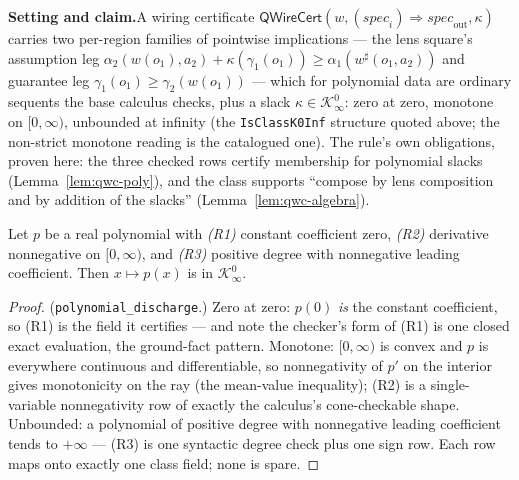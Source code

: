 

\textbf{Setting and claim.}\enspace A wiring certificate
$\mathsf{QWireCert}(w, (\mathit{spec}_i) \Rightarrow
\mathit{spec}_{\mathrm{out}}, \kappa)$ carries two per-region families
of pointwise implications --- the lens square's assumption leg
$\alpha_2(w(o_1), a_2) + \kappa(\gamma_1(o_1)) \geq
\alpha_1(w^{\sharp}(o_1, a_2))$ and guarantee leg
$\gamma_1(o_1) \geq \gamma_2(w(o_1))$
\cite{capuccimyers2026} --- which for polynomial data are ordinary
sequents the base calculus checks, plus a slack
$\kappa \in \mathcal{K}^0_\infty$: zero at zero, monotone on
$[0, \infty)$, unbounded at infinity (the \texttt{IsClassK0Inf}
structure quoted above; the non-strict monotone reading is the
catalogued one). The rule's own obligations, proven here: the three
checked rows certify membership for polynomial slacks
(Lemma~\ref{lem:qwc-poly}), and the class supports ``compose by lens
composition and by addition of the slacks''
(Lemma~\ref{lem:qwc-algebra}).

\begin{blemma}\label{lem:qwc-poly}
Let $p$ be a real polynomial with \emph{(R1)} constant coefficient
zero, \emph{(R2)} derivative nonnegative on $[0, \infty)$, and
\emph{(R3)} positive degree with nonnegative leading coefficient. Then
$x \mapsto p(x)$ is in $\mathcal{K}^0_\infty$.
\end{blemma}
\begin{proof}
(\texttt{polynomial\_discharge}.) Zero at zero: $p(0)$ \emph{is} the
constant coefficient, so (R1) is the field it certifies --- and note
the checker's form of (R1) is one closed exact evaluation, the
ground-fact pattern. Monotone: $[0, \infty)$ is convex and $p$ is
everywhere continuous and differentiable, so nonnegativity of $p'$ on
the interior gives monotonicity on the ray (the mean-value
inequality); (R2) is a single-variable nonnegativity row of exactly
the calculus's cone-checkable shape. Unbounded: a polynomial of
positive degree with nonnegative leading coefficient tends to
$+\infty$ --- (R3) is one syntactic degree check plus one sign row.
Each row maps onto exactly one class field; none is spare.
\end{proof}

